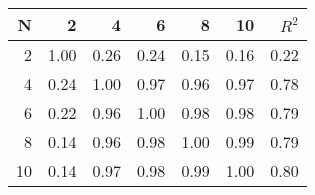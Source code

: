 \begin{tabular}{rrrrrrr}
\toprule
  N &     2 &     4 &     6 &     8 &    10 &  $R^2$ \\
\midrule
  2 &  1.00 &  0.26 &  0.24 &  0.15 &  0.16 &   0.22 \\
  4 &  0.24 &  1.00 &  0.97 &  0.96 &  0.97 &   0.78 \\
  6 &  0.22 &  0.96 &  1.00 &  0.98 &  0.98 &   0.79 \\
  8 &  0.14 &  0.96 &  0.98 &  1.00 &  0.99 &   0.79 \\
 10 &  0.14 &  0.97 &  0.98 &  0.99 &  1.00 &   0.80 \\
\bottomrule
\end{tabular}
